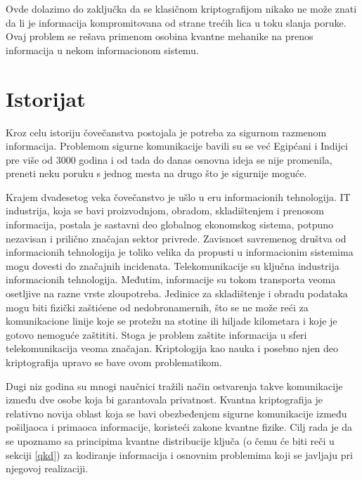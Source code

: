 \documentclass[a4paper]{article}
\begin{document}
{Ovde dolazimo do zaključka da se klasičnom kriptografijom nikako ne može znati da li je informacija kompromitovana od strane trećih lica u toku slanja poruke. Ovaj problem se rešava primenom osobina kvantne mehanike na prenos informacija u nekom informacionom sistemu.
\section{Istorijat}	
\label{sec:istorijat}

Kroz celu istoriju čovečanstva postojala je potreba za sigurnom razmenom informacija. Problemom sigurne komunikacije bavili su se već Egipćani i Indijci pre više od 3000 godina i od tada do danas osnovna ideja se nije promenila, preneti neku poruku s jednog mesta na drugo što je sigurnije moguće.

Krajem dvadesetog veka čovečanstvo je ušlo u eru informacionih tehnologija. IT industrija, koja se bavi proizvodnjom, obradom, skladištenjem i prenosom informacija, postala je sastavni deo globalnog ekonomskog sistema, potpuno nezavisan i prilično značajan sektor privrede. Zavisnost savremenog društva od informacionih tehnologija je toliko velika da propusti u informacionim sistemima mogu dovesti do značajnih incidenata. Telekomunikacije su ključna industrija informacionih tehnologija. Međutim, informacije su tokom transporta veoma osetljive na razne vrste zloupotreba. Jedinice za skladištenje i obradu podataka mogu biti fizički zaštićene od nedobronamernih, što se ne može reći za komunikacione linije koje se protežu na stotine ili hiljade kilometara i koje je gotovo nemoguće zaštititi. Stoga je problem zaštite informacija u sferi telekomunikacija veoma značajan. Kriptologija kao nauka i posebno njen deo kriptografija upravo se bave ovom problematikom.

Dugi niz godina su mnogi naučnici tražili način ostvarenja takve komunikacije između dve osobe koja bi garantovala privatnost. Kvantna kriptografija je relativno novija oblast koja se bavi obezbeđenjem sigurne komunikacije između pošiljaoca i primaoca informacije, koristeći zakone kvantne fizike. Cilj rada je da se upoznamo sa principima kvantne distribucije ključa (o čemu će biti reči u sekciji \ref{qkd}) za kodiranje informacija i osnovnim problemima koji se javljaju pri njegovoj realizaciji.

}
\end{document}
